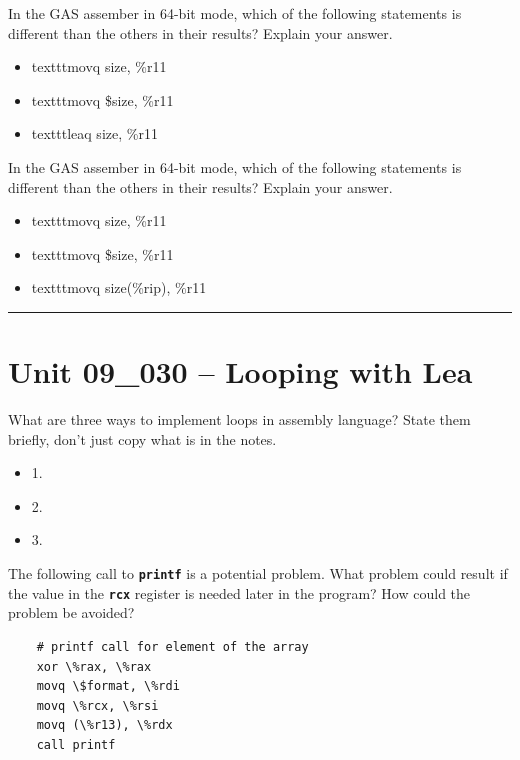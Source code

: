 \documentclass[letterpaper,12pt]{exam}
\newcommand{\unit}{Unit 09}
\begin{document}
\begin{questions}
 \begin{samepage}
     \question In the GAS assember in 64-bit mode, which of the following statements is different than the others in their results?  Explain your answer.
     \begin{itemize}
             \item{texttt{movq size, \%r11}}
            \item {texttt{movq \$size, \%r11}}
            \item {texttt{leaq size, \%r11}}
           \end{itemize}
     \vspace{5mm}
 \end{samepage}
     \question In the GAS assember in 64-bit mode, which of the following statements is different than the others in their results?  Explain your answer.

 \begin{itemize}
             \item{texttt{movq size, \%r11}}
            \item {texttt{movq \$size, \%r11}}
            \item {texttt{movq size(\%rip), \%r11}}
        \end{itemize}
            \vspace{5mm}
 \par
 \rule{0.5\textwidth}{.4pt} %
\section*{\unit\_030 -- Looping with Lea}
\begin{samepage}
    \question What are three ways to implement loops in assembly language?  State them briefly, don't just copy what is in the notes.
    \begin{itemize}
        \item 1.
        \vspace{4mm}
        \item 2.
        \vspace{4mm}
        \item 3.
   \end{itemize}
    \vspace{5mm}
\end{samepage}
\par
\begin{samepage}
    \question The following call to \texttt{\textbf{printf}} is a potential problem.  What problem could result if the value in the \texttt{\textbf{rcx}} register is needed later in the program?
     How could the problem be avoided?
    \begin{verbatim}
    # printf call for element of the array
    xor \%rax, \%rax
    movq \$format, \%rdi
    movq \%rcx, \%rsi
    movq (\%r13), \%rdx
    call printf
\end{verbatim}


\end{samepage}
\end{questions}
\end{document}
